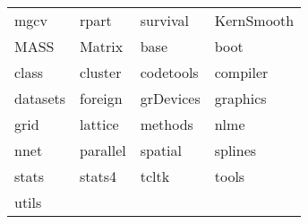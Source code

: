 \begin{tabular}{llll} 
mgcv & rpart & survival & KernSmooth\\ 
MASS & Matrix & base & boot\\ 
class & cluster & codetools & compiler\\ 
datasets & foreign & grDevices & graphics\\ 
grid & lattice & methods & nlme\\ 
nnet & parallel & spatial & splines\\ 
stats & stats4 & tcltk & tools\\ 
utils  &   &   \\ 
\end{tabular}
